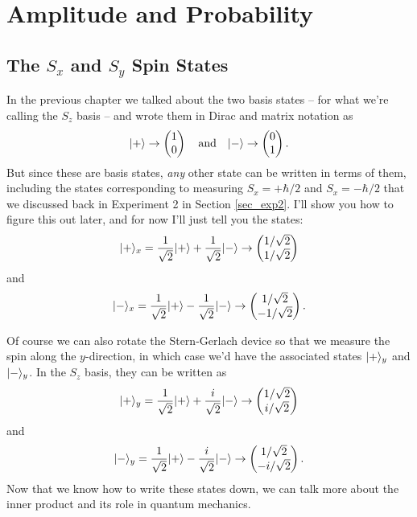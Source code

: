 \chapter{Amplitude and Probability}

\section{The $S_x$ and $S_y$ Spin States}

In the previous chapter we talked about the two basis states -- for what we're calling the $S_z$ basis -- and wrote them in Dirac and matrix notation as
\begin{equation}
| + \rangle \to \begin{pmatrix} 1 \\ 0 \end{pmatrix} \quad \text{and} \quad | - \rangle \to \begin{pmatrix} 0 \\ 1 \end{pmatrix}.
\end{equation}
But since these are basis states, \emph{any} other state can be written in terms of them, including the states corresponding to measuring $S_x = +\hbar/2$ and $S_x = -\hbar/2$ that we discussed back in Experiment 2 in Section \ref{sec_exp2}.  I'll show you how to figure this out later, and for now I'll just tell you the states:
\begin{equation}
| + \rangle_x = \frac{1}{\sqrt{2}} | + \rangle + \frac{1}{\sqrt{2}} | - \rangle \to \begin{pmatrix} 1/\sqrt{2} \\ 1/\sqrt{2} \end{pmatrix}
\end{equation}
and
\begin{equation}
| - \rangle_x = \frac{1}{\sqrt{2}} | + \rangle - \frac{1}{\sqrt{2}} | - \rangle \to \begin{pmatrix} 1/\sqrt{2} \\ -1/\sqrt{2} \end{pmatrix}.
\end{equation}

Of course we can also rotate the Stern-Gerlach device so that we measure the spin along the $y$-direction, in which case we'd have the associated states $| + \rangle_y$ and $| - \rangle_y$.  In the $S_z$ basis, they can be written as
\begin{equation}
| + \rangle_y = \frac{1}{\sqrt{2}} | + \rangle + \frac{i}{\sqrt{2}} | - \rangle \to \begin{pmatrix} 1/\sqrt{2} \\ i/\sqrt{2} \end{pmatrix}
\end{equation}
and
\begin{equation}
| - \rangle_y = \frac{1}{\sqrt{2}} | + \rangle - \frac{i}{\sqrt{2}} | - \rangle \to \begin{pmatrix} 1/\sqrt{2} \\ -i/\sqrt{2} \end{pmatrix}.
\end{equation}
Now that we know how to write these states down, we can talk more about the inner product and its role in quantum mechanics.

